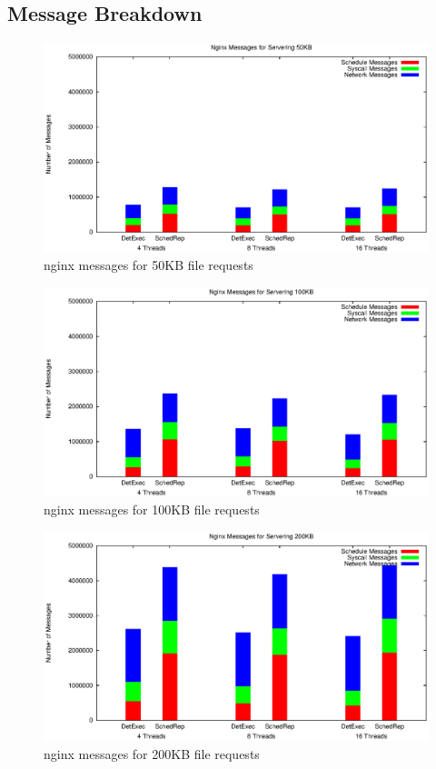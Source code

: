 \subsection{Message Breakdown}
\begin{figure}
\centering
\includegraphics[width=0.8\columnwidth]{figures/ng_msg_50KB}
\caption{nginx messages for 50KB file requests}
\label{f:ng_msg_50k}
\end{figure}
\begin{figure}
\centering
\includegraphics[width=0.8\columnwidth]{figures/ng_msg_100KB}
\caption{nginx messages for 100KB file requests}
\label{f:ng_msg_100k}
\end{figure}
\begin{figure}
\centering
\includegraphics[width=0.8\columnwidth]{figures/ng_msg_200KB}
\caption{nginx messages for 200KB file requests}
\label{f:ng_msg_200k}
\end{figure}
